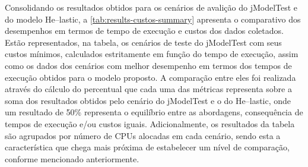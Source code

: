 \documentclass[english,brazilian]{UNISINOSmonografia} %
\begin{document}
Consolidando os resultados obtidos para os cenários de avalição do jModelTest e do modelo \textsf{He}--lastic, a \autoref{tab:results-custos-summary} apresenta o comparativo dos desempenhos em termos de tempo de execução e custos dos dados coletados.
%
Estão representados, na tabela, os cenários de teste do jModelTest com seus custos mínimos, calculados estritamente em função do tempo de execução, assim como os dados dos cenários com melhor desempenho em termos dos tempos de execução obtidos para o modelo proposto.
%
A comparação entre eles foi realizada através do cálculo do percentual que cada uma das métricas representa sobre a soma dos resultados obtidos pelo cenário do jModelTest e o do \textsf{He}--lastic, onde um resultado de 50\% representa o equilíbrio entre as abordagens, consequência de tempos de execução e/ou custos iguais.
%
Adicionalmente, os resultados da tabela são agrupados por número de CPUs alocadas em cada cenário, sendo esta a característica que chega mais próxima de estabelecer um nível de comparação, conforme mencionado anteriormente.
\end{document}
